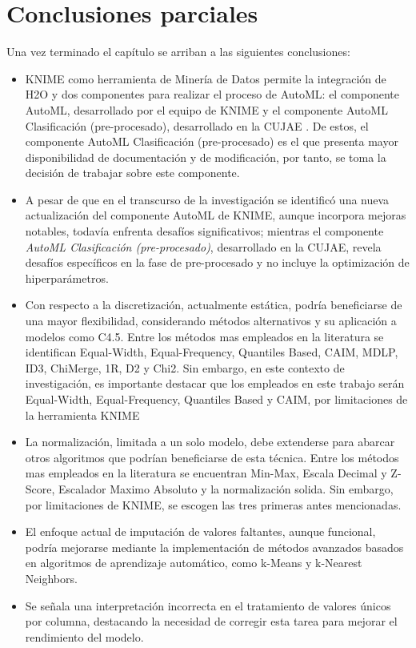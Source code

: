 \section{Conclusiones parciales}
Una vez terminado el capítulo se arriban a las siguientes conclusiones:
\begin{itemize}
	\item KNIME como herramienta de Minería de Datos permite la integración de H2O y dos componentes para realizar el proceso de AutoML: el componente AutoML, desarrollado por el equipo de KNIME y el componente AutoML Clasificación (pre-procesado), desarrollado en la CUJAE \citep{Carrazana2022}. De estos, el componente AutoML Clasificación (pre-procesado) es el que presenta mayor disponibilidad de documentación y de modificación, por tanto, se toma la decisión de trabajar sobre este componente. 
	\item  A pesar de que en el transcurso de la investigación se identificó una nueva actualización del componente AutoML de KNIME, aunque incorpora mejoras notables, todavía enfrenta desafíos significativos; mientras el componente \textit{AutoML Clasificación (pre-procesado)}, desarrollado en la CUJAE, revela desafíos específicos en la fase de pre-procesado y no incluye la optimización de hiperparámetros.
	\item Con respecto a la discretización, actualmente estática, podría beneficiarse de una mayor flexibilidad, considerando métodos alternativos y su aplicación a modelos como C4.5. Entre los métodos mas empleados en la literatura se identifican Equal-Width, Equal-Frequency, Quantiles Based, CAIM, MDLP, ID3, ChiMerge, 1R, D2 y Chi2. Sin embargo, en este contexto de investigación, es importante destacar que los empleados en este trabajo serán Equal-Width, Equal-Frequency, Quantiles Based y CAIM, por limitaciones de la herramienta KNIME
	\item La normalización, limitada a un solo modelo, debe extenderse para abarcar otros algoritmos que podrían beneficiarse de esta técnica. Entre los métodos mas empleados en la literatura se encuentran Min-Max, Escala Decimal y Z-Score, Escalador Maximo Absoluto y la normalización solida. Sin embargo, por limitaciones de KNIME, se escogen las tres primeras antes mencionadas.
	\item El enfoque actual de imputación de valores faltantes, aunque funcional, podría mejorarse mediante la implementación de métodos avanzados basados en algoritmos de aprendizaje automático, como k-Means y k-Nearest Neighbors.
	\item Se señala una interpretación incorrecta en el tratamiento de valores únicos por columna, destacando la necesidad de corregir esta tarea para mejorar el rendimiento del modelo.

\end{itemize}
